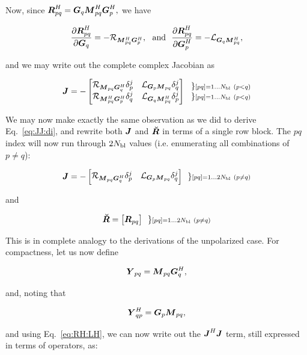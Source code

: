 \documentclass[useAMS,usenatbib]{mn2e}
\newcommand{\mat}[1]{{\bmath{#1}}}
\newcommand{\JJ}{\mat{J}} %
\newcommand{\MM}{\mat{M}}
\newcommand{\RR}{\mat{R}}
\newcommand{\GG}{\mat{G}}
\newcommand{\JHJ}{\JJ^H\JJ} %
\begin{document}
Now, since $\RR^H_{pq}=\GG_q \MM^H_{pq} \GG^H_p,$ we have

\begin{equation}
\label{eq:dRH:dG}
\frac{\partial\RR^H_{pq}}{\partial\GG_q} = -\Rop{\MM^H_{pq}\GG^H_p},\mathrm{~~and~~}
\frac{\partial\RR^H_{pq}}{\partial\GG^H_p} = -\Lop{\GG_q \MM^H_{pq}},
\end{equation}

and we may write out the complete complex Jacobian as

\[
\JJ = - \Matrix{cc}{ 
\Rop{ \MM_{pq}\GG^H_q }\delta^j_p & 
\Lop{ \GG_p \MM_{pq}  }\delta^j_q \\
\Rop{ \MM^H_{pq} \GG^H_p } \delta^j_q & 
\Lop{ \GG_q \MM^H_{pq}  } \delta^j_p  
}~~ 
\Stack{ 
\} \scriptstyle [pq]=1\dots \Nbl~(p<q) \\ 
\} \scriptstyle [pq]=1\dots \Nbl~(p<q) 
}
\]

We may now make exactly the same observation as we did to derive Eq.~\ref{eq:JJ:di}, and rewrite both $\JJ$ and $\RRr$ in terms of 
a single row block. The $pq$ index will now run through $2N_\mathrm{bl}$ values (i.e. enumerating all combinations of $p\ne q$):

\begin{equation}
\label{eq:JJ:pol}
\JJ = - \Matrix{cc}{ 
\Rop{ \MM_{pq}\GG^H_q }\delta^j_p & 
\Lop{ \GG_p \MM_{pq}  }\delta^j_q \\
}~~ 
\} \scriptstyle [pq]=1\dots 2\Nbl~(p\ne q)\\ 
\end{equation}

and 

\begin{equation}
\RRr = \Matrix{c}{ \mat{R}_{pq}}~~ 
\} \scriptstyle [pq]=1\dots 2\Nbl~(p\ne q)\\ 
\end{equation}

This is in complete analogy to the derivations of the unpolarized case. For compactness, let us now define

\newcommand{\YY}{\mat{Y}}
\newcommand{\ZZ}{\mat{Z}}
\[
\YY_{pq} = \MM_{pq} \GG^H_q,
\]

and, noting that 

\[
\YY_{qp}^H = \GG_p \MM_{pq},
\]

and using Eq.~\ref{eq:RH:LH}, we can now write out the $\JHJ$ term, still expressed in terms of 
operators, as:
\end{document}
